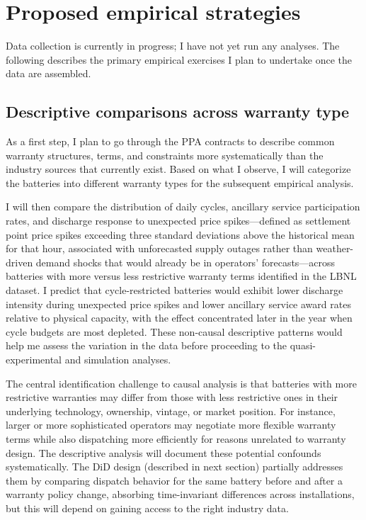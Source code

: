 \documentclass[12pt]{article}
\begin{document}
\section{Proposed empirical strategies}

Data collection is currently in progress; I have not yet run any analyses. The following describes the primary empirical exercises I plan to undertake once the data are assembled.

\subsection{Descriptive comparisons across warranty type} As a first step, I plan to go through the PPA contracts to describe common warranty structures, terms, and constraints more systematically than the industry sources that currently exist. Based on what I observe, I will categorize the batteries into different warranty types for the subsequent empirical analysis.

I will then compare the distribution of daily cycles, ancillary service participation rates, and discharge response to unexpected price spikes---defined as settlement point price spikes exceeding three standard deviations above the historical mean for that hour, associated with unforecasted supply outages rather than weather-driven demand shocks that would already be in operators' forecasts---across batteries with more versus less restrictive warranty terms identified in the LBNL dataset. I predict that cycle-restricted batteries would exhibit lower discharge intensity during unexpected price spikes and lower ancillary service award rates relative to physical capacity, with the effect concentrated later in the year when cycle budgets are most depleted. These non-causal descriptive patterns would help me assess the variation in the data before proceeding to the quasi-experimental and simulation analyses.

The central identification challenge to causal analysis is that batteries with more restrictive warranties may differ from those with less restrictive ones in their underlying technology, ownership, vintage, or market position. For instance, larger or more sophisticated operators may negotiate more flexible warranty terms while also dispatching more efficiently for reasons unrelated to warranty design. The descriptive analysis will document these potential confounds systematically. The DiD design (described in next section) partially addresses them by comparing dispatch behavior for the same battery before and after a warranty policy change, absorbing time-invariant differences across installations, but this will depend on gaining access to the right industry data.
\end{document}

